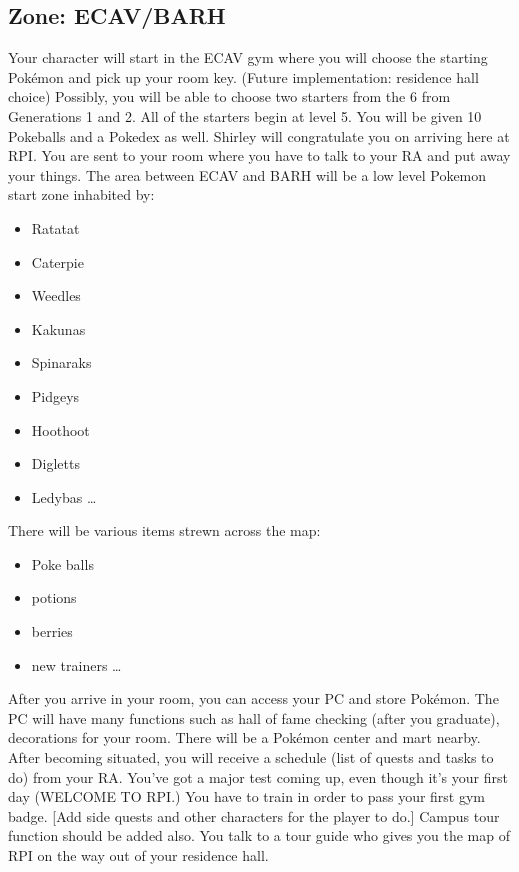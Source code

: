 \documentclass[11pt,fleqn]{book} %
\begin{document}
\subsection {Zone: ECAV/BARH}
	Your character will start in the ECAV gym where you will choose the starting Pokémon and pick up your room key. (Future implementation: residence hall choice) Possibly, you will be able to choose two starters from the 6 from Generations 1 and 2.  All of the starters begin at level 5. You will be given 10 Pokeballs and a Pokedex as well. Shirley will congratulate you on arriving here at RPI.  You are sent to your room where you have to talk to your RA and put away your things. The area between ECAV and BARH will be a low level Pokemon start zone inhabited by:\\
    \begin{itemize}
		\item Ratatat
  		\item Caterpie
  		\item Weedles
        \item Kakunas
  		\item Spinaraks
  		\item Pidgeys
        \item Hoothoot
        \item Digletts
        \item Ledybas
        \ldots
	\end{itemize}
 \indent There will be various items strewn across the map:\\
 \begin{itemize}
		\item Poke balls
  		\item potions
  		\item berries
        \item new trainers
        \ldots
	\end{itemize}
\indent After you arrive in your room, you can access your PC and store Pokémon. The PC will have many functions such as hall of fame checking (after you graduate), decorations for your room. There will be a Pokémon center and mart nearby.\\
\indent After becoming situated, you will receive a schedule (list of quests and tasks to do) from your RA. You’ve got a major test coming up, even though it’s your first day (WELCOME TO RPI.) You have to train in order to pass your first gym badge. [Add side quests and other characters for the player to do.] Campus tour function should be added also. You talk to a tour guide who gives you the map of RPI on the way out of your residence hall.\\
\end{document}
